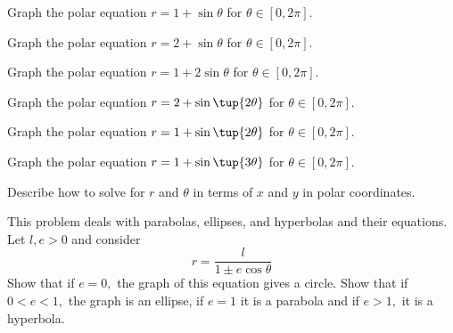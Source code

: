 \begin{enumialphparenastyle}
\begin{ex} Graph the polar equation $r=1+\sin \theta $ for $\theta \in \left[ 0,2\pi \right]$.
\end{ex}

\begin{ex} Graph the polar equation $r=2+\sin \theta $ for $\theta \in \left[ 0,2\pi \right]$.
\end{ex}

\begin{ex} Graph the polar equation $r=1+2\sin \theta $ for $\theta \in \left[ 0,2\pi \right]$.
\end{ex}

\begin{ex} Graph the polar equation $r=2+\sin \tup{2\theta } $ for $\theta \in \left[ 0,2\pi 
\right]$.
\end{ex}

\begin{ex} Graph the polar equation $r=1+\sin \tup{2\theta } $ for $\theta \in \left[ 0,2\pi 
\right]$.
\end{ex}

\begin{ex} Graph the polar equation $r=1+\sin \tup{3\theta } $ for $\theta \in \left[ 0,2\pi 
\right] $.
\end{ex}


\begin{ex} Describe how to solve for $r$ and $\theta $ in terms of $x$ and $y$ in polar
coordinates.
\end{ex}

\begin{ex} This problem deals with parabolas, ellipses, and
hyperbolas and their equations. Let $l,e>0$ and consider
\begin{equation*}
r=\frac{l}{1\pm e\cos \theta }
\end{equation*}
Show that if $e=0,$ the graph of this equation gives a circle. Show that if $0<e<1,$ the graph is an ellipse, if $e=1$
it is a parabola and if $e>1,$ it is a hyperbola.
\end{ex}

\end{enumialphparenastyle}